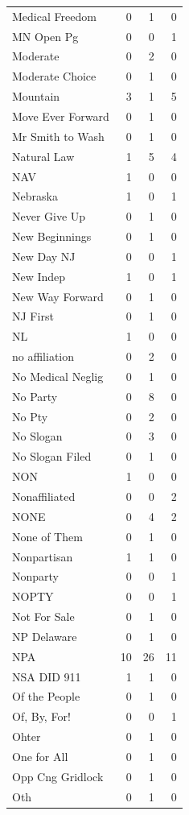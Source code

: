 \begin{supertabular}{lrrr}
Medical Freedom & 0 & 1 & 0\\
MN Open Pg & 0 & 0 & 1\\
Moderate & 0 & 2 & 0\\
Moderate Choice & 0 & 1 & 0\\
Mountain & 3 & 1 & 5\\
Move Ever Forward & 0 & 1 & 0\\
Mr Smith to Wash & 0 & 1 & 0\\
Natural Law & 1 & 5 & 4\\
NAV & 1 & 0 & 0\\
Nebraska & 1 & 0 & 1\\
Never Give Up & 0 & 1 & 0\\
New Beginnings & 0 & 1 & 0\\
New Day NJ & 0 & 0 & 1\\
New Indep & 1 & 0 & 1\\
New Way Forward & 0 & 1 & 0\\
NJ First & 0 & 1 & 0\\
NL & 1 & 0 & 0\\
no  affiliation & 0 & 2 & 0\\
No Medical Neglig & 0 & 1 & 0\\
No Party & 0 & 8 & 0\\
No Pty & 0 & 2 & 0\\
No Slogan & 0 & 3 & 0\\
No Slogan Filed & 0 & 1 & 0\\
NON & 1 & 0 & 0\\
Nonaffiliated & 0 & 0 & 2\\
NONE & 0 & 4 & 2\\
None of Them & 0 & 1 & 0\\
Nonpartisan & 1 & 1 & 0\\
Nonparty & 0 & 0 & 1\\
NOPTY & 0 & 0 & 1\\
Not For Sale & 0 & 1 & 0\\
NP Delaware & 0 & 1 & 0\\
NPA & 10 & 26 & 11\\
NSA DID 911 & 1 & 1 & 0\\
Of the People & 0 & 1 & 0\\
Of, By, For! & 0 & 0 & 1\\
Ohter & 0 & 1 & 0\\
One for All & 0 & 1 & 0\\
Opp Cng Gridlock & 0 & 1 & 0\\
Oth & 0 & 1 & 0\\

\end{supertabular}

